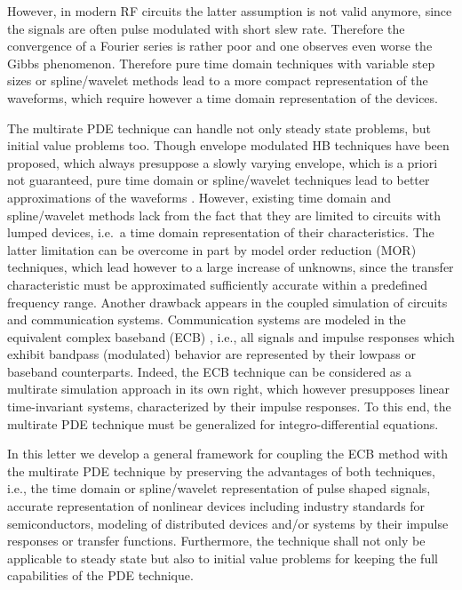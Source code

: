 \documentclass[journal]{IEEEtran}
\begin{document}
However, in modern RF circuits the latter assumption is not valid anymore, since the signals
are often pulse modulated with short slew rate. Therefore the convergence of a Fourier
series is rather poor and one observes even worse the Gibbs phenomenon.
Therefore pure time domain techniques with
variable step sizes or spline/wavelet methods \cite{BiBra14a} lead to a more compact representation of the
waveforms, which require however a time domain representation of the devices. 

The multirate PDE technique can handle 
not only steady state problems, but initial value problems too.
Though envelope modulated HB techniques have been proposed, which always
presuppose a slowly varying envelope, which is a priori not guaranteed, pure time domain or spline/wavelet
techniques lead to better approximations of the waveforms \cite{BiBra14a}. However,  existing time domain 
and spline/wavelet methods
lack from the fact that they are limited to circuits with lumped devices, i.e.\ a time domain
representation of their characteristics.
The latter limitation can be overcome in part by model order reduction (MOR) techniques, which lead
however to a large increase of unknowns, since the transfer characteristic must be
approximated sufficiently accurate within a predefined frequency range. Another drawback appears in the
coupled simulation of circuits and communication systems. Communication systems are modeled in the
equivalent complex baseband  (ECB) \cite{proakis2001digital}, i.e., all signals and impulse responses which
exhibit bandpass (modulated) behavior are represented by their lowpass or baseband counterparts.
Indeed, the ECB technique can be considered as a multirate simulation approach in its own right,
which however presupposes linear time-invariant
systems, characterized by their impulse responses. To this end,
the multirate PDE technique must be generalized for integro-differential equations.


In this letter we develop a general framework for coupling the ECB method with the multirate PDE technique by
preserving the advantages of both techniques, i.e., the time domain or spline/wavelet representation
of pulse shaped signals, accurate representation of nonlinear devices including industry standards
for semiconductors, modeling of distributed devices and/or systems by their impulse responses or
transfer functions. Furthermore, the technique shall not only be applicable to steady state
but also to initial value problems for keeping the full capabilities of the PDE technique.
\end{document}
